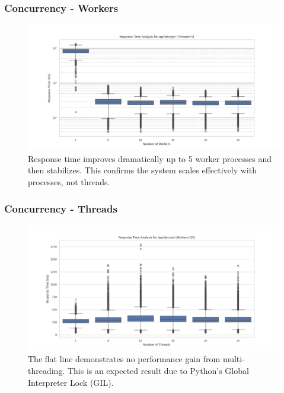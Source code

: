 \documentclass{beamer}
\begin{document}
\begin{frame}
\frametitle{Concurrency - Workers}
\begin{figure}
\includegraphics[width=\textwidth,height=0.75\textheight,keepaspectratio]{images/phase1/api_decrypt/response_time_threads_1.png}
\caption{Response time improves dramatically up to 5 worker processes and then stabilizes. This confirms the system scales effectively with processes, not threads.}
\end{figure}
\end{frame}

\begin{frame}
\frametitle{Concurrency - Threads}
\begin{figure}
\includegraphics[width=\textwidth,height=0.75\textheight,keepaspectratio]{images/phase1/api_decrypt/response_time_workers_25.png}
\caption{The flat line demonstrates no performance gain from multi-threading. This is an expected result due to Python's Global Interpreter Lock (GIL).}
\end{figure}
\end{frame}
\end{document}
